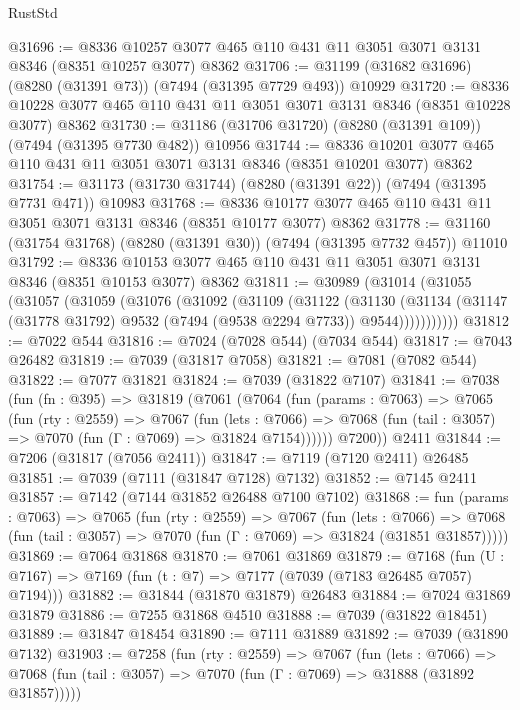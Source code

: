 \begin{lexlean}{RustStd}
\begin{coremodule}
@31696 := @8336 @10257 @3077 @465 @110 @431 @11 @3051 @3071 @3131 @8346 (@8351 @10257 @3077) @8362
@31706 := @31199 (@31682 @31696) (@8280 (@31391 @73)) (@7494 (@31395 @7729 @493)) @10929
@31720 := @8336 @10228 @3077 @465 @110 @431 @11 @3051 @3071 @3131 @8346 (@8351 @10228 @3077) @8362
@31730 := @31186 (@31706 @31720) (@8280 (@31391 @109)) (@7494 (@31395 @7730 @482)) @10956
@31744 := @8336 @10201 @3077 @465 @110 @431 @11 @3051 @3071 @3131 @8346 (@8351 @10201 @3077) @8362
@31754 := @31173 (@31730 @31744) (@8280 (@31391 @22)) (@7494 (@31395 @7731 @471)) @10983
@31768 := @8336 @10177 @3077 @465 @110 @431 @11 @3051 @3071 @3131 @8346 (@8351 @10177 @3077) @8362
@31778 := @31160 (@31754 @31768) (@8280 (@31391 @30)) (@7494 (@31395 @7732 @457)) @11010
@31792 := @8336 @10153 @3077 @465 @110 @431 @11 @3051 @3071 @3131 @8346 (@8351 @10153 @3077) @8362
@31811 := @30989
    (@31014
      (@31055
        (@31057
          (@31059
            (@31076
              (@31092
                (@31109
                  (@31122
                    (@31130
                      (@31134
                        (@31147 (@31778 @31792) @9532 (@7494 (@9538 @2294 @7733)) @9544)))))))))))
@31812 := @7022 @544
@31816 := @7024 (@7028 @544) (@7034 @544)
@31817 := @7043 @26482
@31819 := @7039 (@31817 @7058)
@31821 := @7081 (@7082 @544)
@31822 := @7077 @31821
@31824 := @7039 (@31822 @7107)
@31841 := @7038
    (fun (fn : @395) =>
    @31819
      (@7061
        (@7064
          (fun (params : @7063) =>
          @7065
            (fun (rty : @2559) =>
            @7067
              (fun (lets : @7066) =>
              @7068 (fun (tail : @3057) => @7070 (fun (Γ : @7069) => @31824 @7154))))))
        @7200))
    @2411
@31844 := @7206 (@31817 (@7056 @2411))
@31847 := @7119 (@7120 @2411) @26485
@31851 := @7039 (@7111 (@31847 @7128) @7132)
@31852 := @7145 @2411
@31857 := @7142 (@7144 @31852 @26488 @7100 @7102)
@31868 := fun (params : @7063) =>
  @7065
    (fun (rty : @2559) =>
    @7067
      (fun (lets : @7066) =>
      @7068 (fun (tail : @3057) => @7070 (fun (Γ : @7069) => @31824 (@31851 @31857)))))
@31869 := @7064 @31868
@31870 := @7061 @31869
@31879 := @7168
    (fun (U : @7167) => @7169 (fun (t : @7) => @7177 (@7039 (@7183 @26485 @7057) @7194)))
@31882 := @31844 (@31870 @31879) @26483
@31884 := @7024 @31869 @31879
@31886 := @7255 @31868 @4510
@31888 := @7039 (@31822 @18451)
@31889 := @31847 @18454
@31890 := @7111 @31889
@31892 := @7039 (@31890 @7132)
@31903 := @7258
    (fun (rty : @2559) =>
    @7067
      (fun (lets : @7066) =>
      @7068 (fun (tail : @3057) => @7070 (fun (Γ : @7069) => @31888 (@31892 @31857)))))

\end{coremodule}
\end{lexlean}
